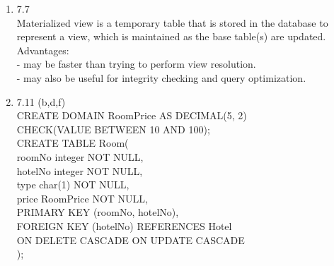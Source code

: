 \documentclass[10pt]{article}
\begin{document}
\begin{enumerate}
\item 7.7\\
  Materialized view is a temporary table that is stored in the
  database to represent a view, which is maintained as the base
  table(s) are updated.\\

  Advantages:\\
  - may be faster than trying to perform view resolution.\\
  - may also be useful for integrity checking and query optimization.

\item 7.11 (b,d,f)\\
  CREATE DOMAIN RoomPrice AS DECIMAL(5, 2)\\
  CHECK(VALUE BETWEEN 10 AND 100);\\

  CREATE TABLE Room(\\
  \-\hspace{2em}roomNo integer NOT NULL,\\
  \-\hspace{2em}hotelNo integer NOT NULL,\\
  \-\hspace{2em}type char(1) NOT NULL,\\
  \-\hspace{2em}price RoomPrice NOT NULL,\\
  \-\hspace{2em}PRIMARY KEY (roomNo, hotelNo),\\
  \-\hspace{2em}FOREIGN KEY (hotelNo) REFERENCES Hotel\\
  \-\hspace{2em}ON DELETE CASCADE ON UPDATE CASCADE\\
  );\\


\end{enumerate}
\end{document}
